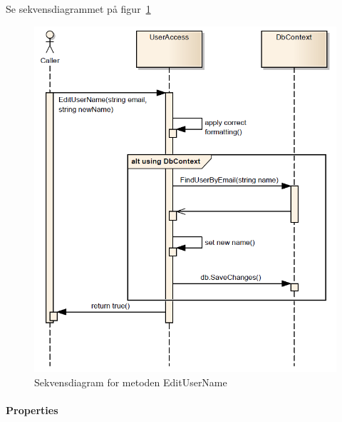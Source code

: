 Se sekvensdiagrammet på figur~\ref{fig:editUserName}

\begin{figure}[h]
\centering
\includegraphics[width=0.7\linewidth]{figs/dbSeq/editUserName.PNG}
\caption{Sekvensdiagram for metoden EditUserName}
\label{fig:editUserName}
\end{figure}


\paragraph{Properties}\